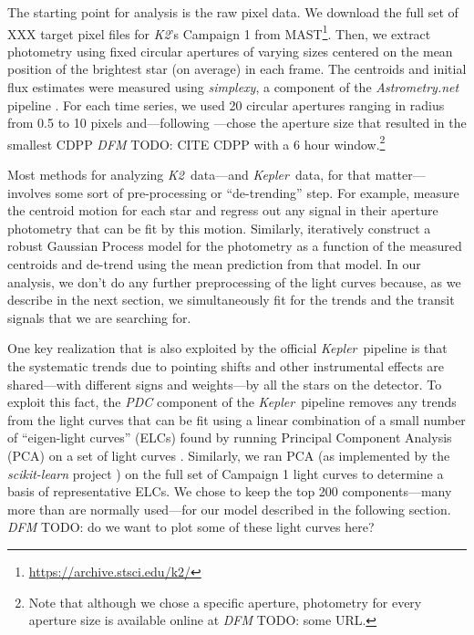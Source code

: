 \documentclass[12pt,preprint]{aastex}
\newcommand{\project}[1]{\emph{#1}}
\newcommand{\kepler}{\project{Kepler}}
\newcommand{\KT}{\project{K2}}
\newcommand{\todo}[3]{{\color{#2} \emph{#1} TODO: #3}}
\newcommand{\dfmtodo}[1]{\todo{DFM}{red}{#1}}
\begin{document}
The starting point for analysis is the raw pixel data.
We download the full set of XXX target pixel files for \KT's Campaign 1 from
MAST\footnote{\url{https://archive.stsci.edu/k2/}}.
Then, we extract photometry using fixed circular apertures of varying sizes
centered on the mean position of the brightest star (on average) in each
frame.
The centroids and initial flux estimates were measured using
\project{simplexy}, a component of the \project{Astrometry.net} pipeline
\citep{astrometry}.
For each time series, we used 20 circular apertures ranging in radius from 0.5
to 10 pixels and---following \citet{vanderberg-a}---chose the aperture size
that resulted in the smallest CDPP \dfmtodo{CITE CDPP} with a 6 hour
window.\footnote{Note that although we chose a specific aperture, photometry
for every aperture size is available online at \dfmtodo{some URL}.}

Most methods for analyzing \KT\ data---and \kepler\ data, for that
matter---involves some sort of pre-processing or ``de-trending'' step.
For example, \citet{vanderberg-a} measure the centroid motion for each star
and regress out any signal in their aperture photometry that can be fit by
this motion.
Similarly, \citet{crossfield} iteratively construct a robust Gaussian Process
model for the photometry as a function of the measured centroids and de-trend
using the mean prediction from that model.
In our analysis, we don't do any further preprocessing of the light curves
because, as we describe in the next section, we simultaneously fit for the
trends and the transit signals that we are searching for.

One key realization that is also exploited by the official \kepler\ pipeline
is that the systematic trends due to pointing shifts and other instrumental
effects are shared---with different signs and weights---by all the stars on
the detector.
To exploit this fact, the \project{PDC} component of the \kepler\ pipeline
removes any trends from the light curves that can be fit using a linear
combination of a small number of ``eigen-light curves'' (ELCs) found by
running Principal Component Analysis (PCA) on a set of light curves
\citep{map-pdc1, map-pdc2}.
Similarly, we ran PCA (as implemented by the \project{scikit-learn} project
\citealt{sklearn}) on the full set of Campaign 1 light curves to determine a
basis of representative ELCs.
We chose to keep the top 200 components---many more than are normally
used---for our model described in the following section.
\dfmtodo{do we want to plot some of these light curves here?}
\end{document}

